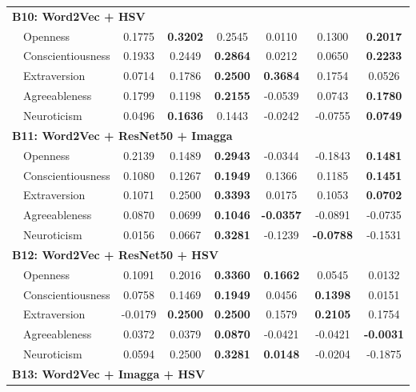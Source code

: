 \begin{longtable}{llcccccc}
\hline
\multicolumn{8}{l}{\textbf{B10: Word2Vec + HSV}} \\

& Openness & 0.1775 & \textbf{0.3202} & 0.2545 & 0.0110 & 0.1300 & \textbf{0.2017} \\
& Conscientiousness & 0.1933 & 0.2449 & \textbf{0.2864} & 0.0212 & 0.0650 & \textbf{0.2233} \\
& Extraversion & 0.0714 & 0.1786 & \textbf{0.2500} & \textbf{0.3684} & 0.1754 & 0.0526 \\
& Agreeableness & 0.1799 & 0.1198 & \textbf{0.2155} & -0.0539 & 0.0743 & \textbf{0.1780} \\
& Neuroticism & 0.0496 & \textbf{0.1636} & 0.1443 & -0.0242 & -0.0755 & \textbf{0.0749} \\

\hline
\multicolumn{8}{l}{\textbf{B11: Word2Vec + ResNet50 + Imagga}} \\

& Openness & 0.2139 & 0.1489 & \textbf{0.2943} & -0.0344 & -0.1843 & \textbf{0.1481} \\
& Conscientiousness & 0.1080 & 0.1267 & \textbf{0.1949} & 0.1366 & 0.1185 & \textbf{0.1451} \\
& Extraversion & 0.1071 & 0.2500 & \textbf{0.3393} & 0.0175 & 0.1053 & \textbf{0.0702} \\
& Agreeableness & 0.0870 & 0.0699 & \textbf{0.1046} & \textbf{-0.0357} & -0.0891 & -0.0735 \\
& Neuroticism & 0.0156 & 0.0667 & \textbf{0.3281} & -0.1239 & \textbf{-0.0788} & -0.1531 \\

\hline
\multicolumn{8}{l}{\textbf{B12: Word2Vec + ResNet50 + HSV}} \\

& Openness & 0.1091 & 0.2016 & \textbf{0.3360} & \textbf{0.1662} & 0.0545 & 0.0132 \\
& Conscientiousness & 0.0758 & 0.1469 & \textbf{0.1949} & 0.0456 & \textbf{0.1398} & 0.0151 \\
& Extraversion & -0.0179 & \textbf{0.2500} & \textbf{0.2500} & 0.1579 & \textbf{0.2105} & 0.1754 \\
& Agreeableness & 0.0372 & 0.0379 & \textbf{0.0870} & -0.0421 & -0.0421 & \textbf{-0.0031} \\
& Neuroticism & 0.0594 & 0.2500 & \textbf{0.3281} & \textbf{0.0148} & -0.0204 & -0.1875 \\

\hline
\multicolumn{8}{l}{\textbf{B13: Word2Vec + Imagga + HSV}} \\


\end{longtable}
